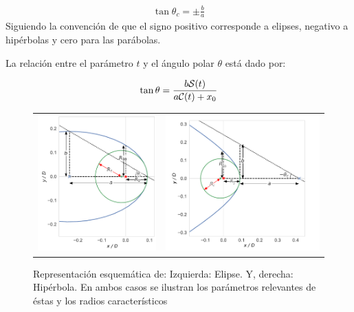\begin{align}
  \tan\theta_c = \pm \frac{b}{a} \label{eq:thc}
\end{align}
Siguiendo la convención de que el signo positivo corresponde a elipses, negativo a
hipérbolas y cero para las parábolas.

La relación entre el parámetro $t$ y el ángulo polar $\theta$ está dado por:

\begin{align}
  \tan\theta = \frac{b\mathcal{S}(t)}{a\mathcal{C}(t) + x_0} \label{eq:t-th-conversion}
\end{align}

\begin{figure}
  \begin{tabular}{cc}
    \includegraphics[width=0.5\linewidth]{./Figures/ellipse_edited} &
    \includegraphics[width=0.5\linewidth]{./Figures/hyperbola_edited}
  \end{tabular}
  \label{fig:conics}
  \caption{Representación esquemática de: Izquierda: Elipse. Y, derecha: Hipérbola.
  En ambos casos se ilustran los parámetros relevantes de éstas y los radios característicos}
\end{figure}

